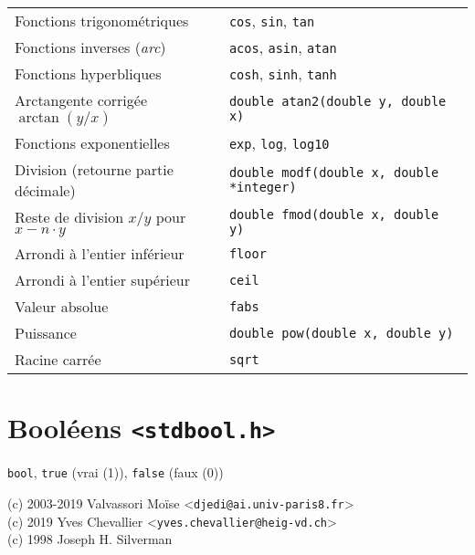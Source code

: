 \documentclass{article}
\newcommand{\cd}{\lstinline}
\begin{document}
\begin{multicols*}{3}
\begin{tabularx}{\linewidth}{Xl}
  Fonctions trigonométriques & \cd{cos}, \cd{sin}, \cd{tan} \\
  Fonctions inverses (\emph{arc}) & \cd{acos}, \cd{asin}, \cd{atan} \\
  Fonctions hyperbliques & \cd{cosh}, \cd{sinh}, \cd{tanh} \\
  Arctangente corrigée $\arctan(y / x)$ & \cd{double atan2(double y, double x)} \\
  Fonctions exponentielles & \cd{exp}, \cd{log}, \cd{log10} \\
  Division (retourne partie décimale) & \cd{double modf(double x, double *integer)} \\
  Reste de division $x/y$ pour $x - n \cdot y$ & \cd{double fmod(double x, double y)} \\
  Arrondi à l'entier inférieur & \cd{floor} \\
  Arrondi à l'entier supérieur & \cd{ceil} \\
  Valeur absolue & \cd{fabs} \\
  Puissance & \cd{double pow(double x, double y)} \\
  Racine carrée & \cd{sqrt} \\
\end{tabularx}

\section*{Booléens \texttt{<stdbool.h>}}

\cd{bool}, \cd{true} (vrai (1)), \cd{false} (faux (0))


{
  \color{gray}
  \small
  (c) 2003-2019 Valvassori Moïse <\texttt{djedi@ai.univ-paris8.fr}> \\
  (c) 2019 Yves Chevallier <\texttt{yves.chevallier@heig-vd.ch}> \\
  (c) 1998 Joseph H. Silverman
}
\end{multicols*}
\end{document}
